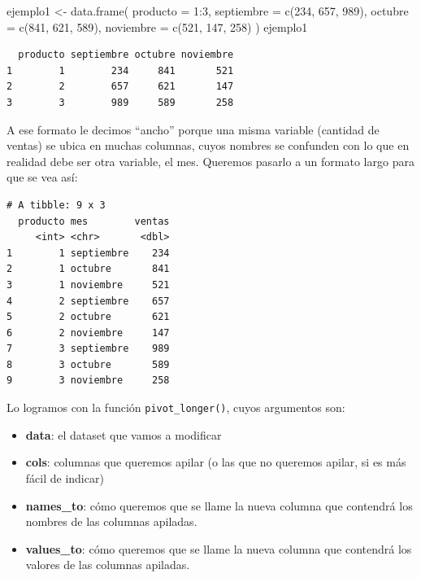 \documentclass[
]{book}
\newenvironment{Shaded}{\begin{snugshade}}{\end{snugshade}}
\newcommand{\AttributeTok}[1]{\textcolor[rgb]{0.77,0.63,0.00}{#1}}
\newcommand{\DecValTok}[1]{\textcolor[rgb]{0.00,0.00,0.81}{#1}}
\newcommand{\FunctionTok}[1]{\textcolor[rgb]{0.00,0.00,0.00}{#1}}
\newcommand{\NormalTok}[1]{#1}
\newcommand{\OtherTok}[1]{\textcolor[rgb]{0.56,0.35,0.01}{#1}}
\newcommand{\SpecialCharTok}[1]{\textcolor[rgb]{0.00,0.00,0.00}{#1}}
\providecommand{\tightlist}{%
  \setlength{\itemsep}{0pt}\setlength{\parskip}{0pt}}
\begin{document}
\begin{Shaded}
\begin{Highlighting}[]
\NormalTok{ejemplo1 }\OtherTok{\textless{}{-}} \FunctionTok{data.frame}\NormalTok{(}
  \AttributeTok{producto =} \DecValTok{1}\SpecialCharTok{:}\DecValTok{3}\NormalTok{,}
  \AttributeTok{septiembre =} \FunctionTok{c}\NormalTok{(}\DecValTok{234}\NormalTok{, }\DecValTok{657}\NormalTok{, }\DecValTok{989}\NormalTok{),}
  \AttributeTok{octubre =} \FunctionTok{c}\NormalTok{(}\DecValTok{841}\NormalTok{, }\DecValTok{621}\NormalTok{, }\DecValTok{589}\NormalTok{),}
  \AttributeTok{noviembre =} \FunctionTok{c}\NormalTok{(}\DecValTok{521}\NormalTok{, }\DecValTok{147}\NormalTok{, }\DecValTok{258}\NormalTok{)}
\NormalTok{)}
\NormalTok{ejemplo1}
\end{Highlighting}
\end{Shaded}

\begin{verbatim}
  producto septiembre octubre noviembre
1        1        234     841       521
2        2        657     621       147
3        3        989     589       258
\end{verbatim}

A ese formato le decimos ``ancho'' porque una misma variable (cantidad de ventas) se ubica en muchas columnas, cuyos nombres se confunden con lo que en realidad debe ser otra variable, el mes. Queremos pasarlo a un formato largo para que se vea así:

\begin{verbatim}
# A tibble: 9 x 3
  producto mes        ventas
     <int> <chr>       <dbl>
1        1 septiembre    234
2        1 octubre       841
3        1 noviembre     521
4        2 septiembre    657
5        2 octubre       621
6        2 noviembre     147
7        3 septiembre    989
8        3 octubre       589
9        3 noviembre     258
\end{verbatim}

Lo logramos con la función \texttt{pivot\_longer()}, cuyos argumentos son:

\begin{itemize}
\tightlist
\item
  \textbf{data}: el dataset que vamos a modificar
\item
  \textbf{cols}: columnas que queremos apilar (o las que no queremos apilar, si es más fácil de indicar)
\item
  \textbf{names\_to}: cómo queremos que se llame la nueva columna que contendrá los nombres de las columnas apiladas.
\item
  \textbf{values\_to}: cómo queremos que se llame la nueva columna que contendrá los valores de las columnas apiladas.
\end{itemize}
\end{document}
